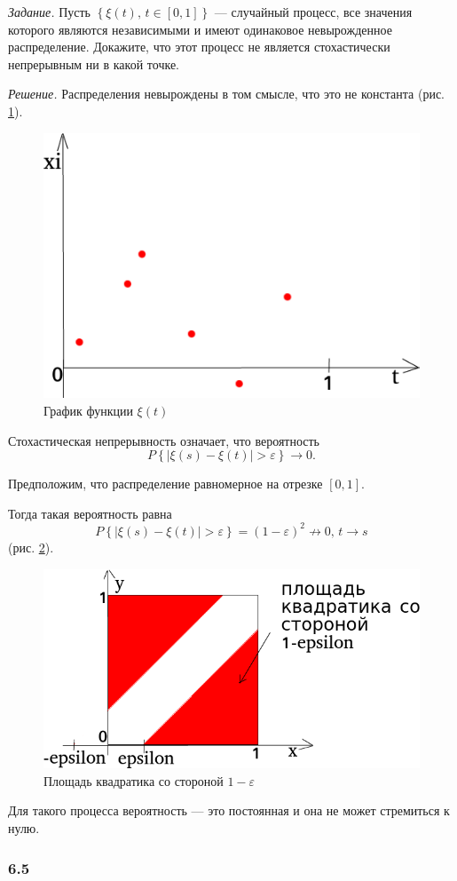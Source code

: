 \textit{Задание.}
Пусть $ \left\{ \xi \left( t \right), \, t \in \left[ 0, 1 \right] \right\} $ ---
случайный процесс, все значения которого являются независимыми и имеют одинаковое невырожденное
распределение.
Докажите, что этот процесс не является стохастически непрерывным ни в какой точке.

\textit{Решение.}
Распределения невырождены в том смысле, что это не константа (рис. \ref{fig:64}).

\begin{figure}[h!]
  \centering
  \includegraphics[width=.4\textwidth]{./pictures/6_4.png}
  \caption{График функции $ \xi \left( t \right) $}
  \label{fig:64}
\end{figure}

Стохастическая непрерывность означает, что вероятность
$$P \left\{ \left| \xi \left( s \right) - \xi \left( t \right) \right| > \varepsilon \right\} \to
  0.$$

Предположим, что распределение равномерное на отрезке $ \left[ 0, 1 \right] $.

Тогда такая вероятность равна
$$P \left\{ \left| \xi \left( s \right) - \xi \left( t \right) \right| > \varepsilon \right\} =
  \left( 1 - \varepsilon \right)^2 \not \to
  0, \,
  t \to s$$
(рис. \ref{fig:641}).

\begin{figure}[h!]
  \centering
  \includegraphics[width=.4\textwidth]{./pictures/6_4_1.png}
  \caption{Площадь квадратика со стороной $1 - \varepsilon$}
  \label{fig:641}
\end{figure}

Для такого процесса вероятность --- это постоянная и она не может стремиться к нулю.

\subsubsection*{6.5}

